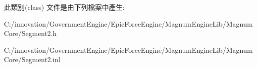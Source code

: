 此類別(class) 文件是由下列檔案中產生\+:\begin{DoxyCompactItemize}
\item 
C\+:/innovation/\+Government\+Engine/\+Epic\+Force\+Engine/\+Magnum\+Engine\+Lib/\+Magnum\+Core/Segment2.\+h\item 
C\+:/innovation/\+Government\+Engine/\+Epic\+Force\+Engine/\+Magnum\+Engine\+Lib/\+Magnum\+Core/Segment2.\+inl\end{DoxyCompactItemize}
